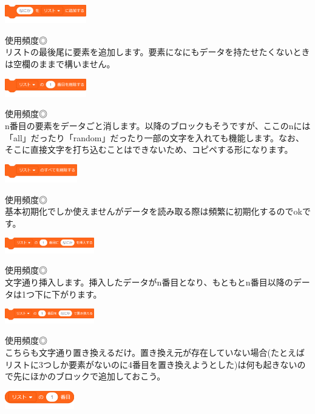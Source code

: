 \documentclass[b5paper,10pt]{jsarticle}
\begin{document}
\begin{multicols*}{3}
\begin{itembox}{1}
\includegraphics[height=8mm]{images/lists_1.png}
\end{itembox}
使用頻度◎\\
リストの最後尾に要素を追加します。要素になにもデータを持たせたくないときは空欄のままで構いません。
\begin{itembox}{2}
\includegraphics[height=8mm]{images/lists_2.png}
\end{itembox}
使用頻度◎\\
n番目の要素をデータごと消します。以降のブロックもそうですが、ここのnには「all」だったり「random」だったり一部の文字を入れても機能します。なお、そこに直接文字を打ち込むことはできないため、コピペする形になります。
\begin{itembox}{3}
\includegraphics[height=8mm]{images/lists_3.png}
\end{itembox}
使用頻度◎\\
基本初期化でしか使えませんがデータを読み取る際は頻繁に初期化するのでokです。
\begin{itembox}{4}
\includegraphics[width=39mm]{images/lists_4.png}
\end{itembox}
使用頻度◎\\
文字通り挿入します。挿入したデータがn番目となり、もともとn番目以降のデータは1つ下に下がります。
\begin{itembox}{5}
\includegraphics[width=39mm]{images/lists_5.png}
\end{itembox}
使用頻度◎\\
こちらも文字通り置き換えるだけ。置き換え元が存在していない場合(たとえばリストに3つしか要素がないのに4番目を置き換えようとした)は何も起きないので先にほかのブロックで追加しておこう。
\begin{itembox}{6}
\includegraphics[height=8mm]{images/lists_6.png}

\end{itembox}
\end{multicols*}
\end{document}
